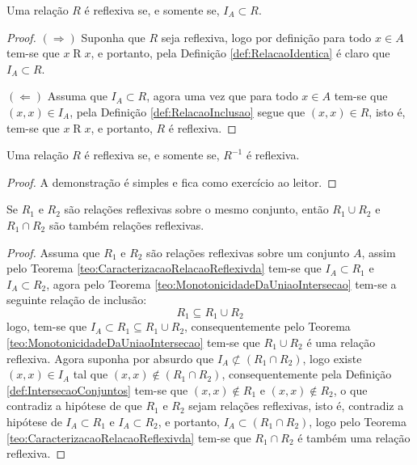 \begin{theorem}\label{teo:CaracterizacaoRelacaoReflexivda}
	Uma relação $R$ é reflexiva se, e somente se, $I_A \subset R$.
\end{theorem}

\begin{proof}
	$(\Rightarrow)$ Suponha que $R$ seja reflexiva, logo por definição para todo $x \in A$ tem-se que $x \mathrel{R} x$, e portanto, pela Definição \ref{def:RelacaoIdentica} é claro que $I_A \subset R$.
	
	$(\Leftarrow)$ Assuma que $I_A \subset R$, agora uma vez que para todo $x \in A$ tem-se que $(x, x) \in I_A$, pela Definição \ref{def:RelacaoInclusao} segue que $(x, x) \in R$, isto é, tem-se que $x \mathrel{R} x$, e portanto, $R$ é reflexiva.
\end{proof}

\begin{corollary}\label{col:CaracterizacaoRelacaoReflexivda}
	Uma relação $R$ é reflexiva se, e somente se, $R^{-1}$ é reflexiva.
\end{corollary}

\begin{proof}
	A demonstração é simples e fica como exercício ao leitor.
\end{proof}

\begin{theorem}\label{teo:FechoAlgebricoRelacoesReflexivas}
	Se $R_1$ e $R_2$ são relações reflexivas sobre o mesmo conjunto, então $R_1 \cup R_2$ e $R_1 \cap R_2$ são também relações reflexivas.
\end{theorem}

\begin{proof}
	Assuma que $R_1$ e $R_2$ são relações reflexivas sobre um conjunto $A$, assim pelo Teorema \ref{teo:CaracterizacaoRelacaoReflexivda} tem-se que $I_A \subset R_1$ e $I_A \subset R_2$, agora pelo Teorema \ref{teo:MonotonicidadeDaUniaoIntersecao} tem-se a seguinte relação de inclusão:
	$$R_1 \subseteq R_1 \cup R_2$$
	logo, tem-se que $I_A \subset R_1 \subseteq R_1 \cup R_2$, consequentemente pelo Teorema \ref{teo:MonotonicidadeDaUniaoIntersecao} tem-se que $R_1 \cup R_2$ é uma relação reflexiva. Agora suponha por absurdo que $I_A \not\subset (R_1 \cap R_2)$, logo existe $(x, x) \in I_A$ tal que $(x, x) \notin (R_1 \cap R_2)$, consequentemente pela Definição \ref{def:IntersecaoConjuntos} tem-se que $(x, x) \notin R_1$ e $(x, x) \notin R_2$, o que contradiz a hipótese de que $R_1$ e $R_2$ sejam relações reflexivas, isto é, contradiz a hipótese de $I_A \subset R_1$ e $I_A \subset R_2$, e portanto, $I_A \subset (R_1 \cap R_2)$, logo pelo Teorema \ref{teo:CaracterizacaoRelacaoReflexivda} tem-se que $R_1 \cap R_2$ é também uma relação reflexiva.
\end{proof}


